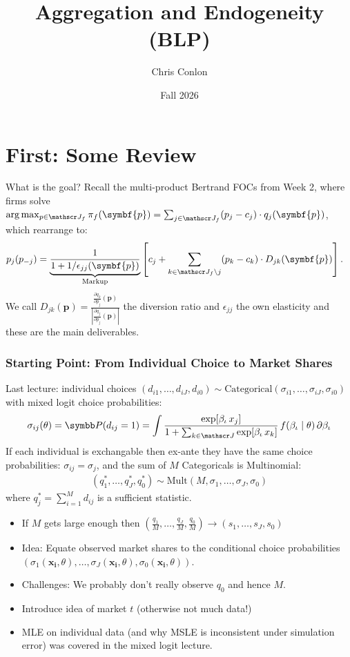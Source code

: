 \documentclass[aspectratio=169,10pt]{beamer}
\title{Aggregation and Endogeneity (BLP)}
\author{Chris Conlon}
\institute{NYU Stern}
\date{Fall 2026}
\begin{document}
\begin{frame}[plain] %
\titlepage
\end{frame}


\section{First: Some Review}

\begin{frame}{What is the goal?}
\small
Recall the multi-product Bertrand FOCs from Week 2, where firms solve $\arg \max_{p \in \calJ_f} \pi_f (\symbf{p}) = \sum_{j \in \calJ_f} (p_j - c_j) \cdot q_j(\symbf{p})$, which rearrange to:
\begin{align*}
p_j(p_{-j}) &= \underbrace{\frac{1}{1+1/\epsilon_{jj}(\symbf{p})}}_{\text{Markup}} \left[ c_j + \sum_{k \in \calJ_{f} \setminus j}  (p_k-c_k) \cdot  D_{jk} (\symbf{p}) \right].
\end{align*}
We call $D_{jk}(\symbf{p}) = \frac{\frac{\partial q_{k}}{\partial p_j}(\symbf{p})}{\left| \frac{\partial q_{j}}{\partial p_j}(\symbf{p}) \right|}$ the \alert{diversion ratio} and $\epsilon_{jj}$ the \alert{own elasticity} and these are the main deliverables.
\end{frame}

\begin{frame}
\frametitle{Starting Point: From Individual Choice to Market Shares}
\small
Last lecture: individual choices $(d_{i1},\ldots,d_{iJ},d_{i0}) \sim \text{Categorical} (\sigma_{i1},\ldots,\sigma_{iJ},\sigma_{i0})$ with mixed logit choice probabilities:
\begin{align*}
\sigma_{ij}(\theta)= \Pr(d_{ij}=1) = \int \frac{\exp[\beta_{\iota} \, x_j]}{1+\sum_{k \in \calJ} \exp[\beta_{\iota} \, x_k]}\, f(\beta_{\iota} \mid \theta)\, \partial \beta_{\iota}
\end{align*}
If each individual is \alert{exchangable} then ex-ante they have the same choice probabilities: $\sigma_{ij}=\sigma_j$, and the sum of $M$ Categoricals is Multinomial:
\begin{align*}
(q_{1}^{*},\ldots,q_{J}^{*},q_{0}^{*}) \sim \text{Mult} (M, \sigma_{1},\ldots,\sigma_{J},\sigma_{0} )
\end{align*}
where $q_{j}^{*}=\sum_{i=1}^M d_{ij}$ is a \alert{sufficient statistic}.
\begin{itemize}
\item If $M$ gets large enough then $(\frac{q_1}{M},\ldots,\frac{q_J}{M},\frac{q_0}{M})\rightarrow (s_1,\ldots,s_J,s_0)$
 \item Idea: Equate observed market shares to the conditional choice probabilities $(\sigma_1(\symbf{x_i},\theta),\ldots,\sigma_J(\symbf{x_i},\theta),\sigma_0(\symbf{x_i},\theta))$.
\item  Challenges: We probably don't really observe $q_0$ and hence $M$.
\item Introduce idea of market $t$ (otherwise not much data!)
\item MLE on individual data (and why MSLE is \alert{inconsistent} under simulation error) was covered in the mixed logit lecture.
\end{itemize}
\end{frame}
\end{document}
